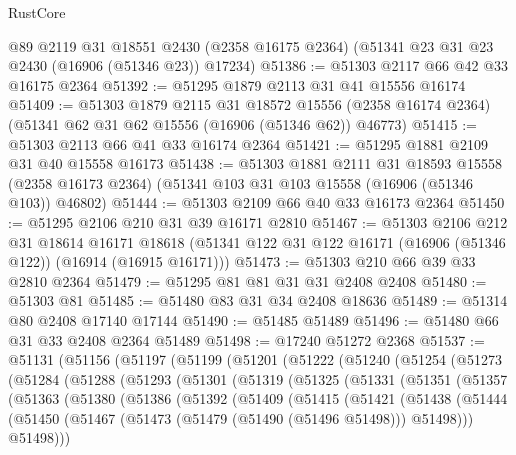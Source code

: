 \begin{lexlean}{RustCore}
\begin{coremodule}
    @89
    @2119
    @31
    @18551
    @2430
    (@2358 @16175 @2364)
    (@51341 @23 @31 @23 @2430 (@16906 (@51346 @23)) @17234)
@51386 := @51303 @2117 @66 @42 @33 @16175 @2364
@51392 := @51295 @1879 @2113 @31 @41 @15556 @16174
@51409 := @51303
    @1879
    @2115
    @31
    @18572
    @15556
    (@2358 @16174 @2364)
    (@51341 @62 @31 @62 @15556 (@16906 (@51346 @62)) @46773)
@51415 := @51303 @2113 @66 @41 @33 @16174 @2364
@51421 := @51295 @1881 @2109 @31 @40 @15558 @16173
@51438 := @51303
    @1881
    @2111
    @31
    @18593
    @15558
    (@2358 @16173 @2364)
    (@51341 @103 @31 @103 @15558 (@16906 (@51346 @103)) @46802)
@51444 := @51303 @2109 @66 @40 @33 @16173 @2364
@51450 := @51295 @2106 @210 @31 @39 @16171 @2810
@51467 := @51303
    @2106
    @212
    @31
    @18614
    @16171
    @18618
    (@51341 @122 @31 @122 @16171 (@16906 (@51346 @122)) (@16914 (@16915 @16171)))
@51473 := @51303 @210 @66 @39 @33 @2810 @2364
@51479 := @51295 @81 @81 @31 @31 @2408 @2408
@51480 := @51303 @81
@51485 := @51480 @83 @31 @34 @2408 @18636
@51489 := @51314 @80 @2408 @17140 @17144
@51490 := @51485 @51489
@51496 := @51480 @66 @31 @33 @2408 @2364 @51489
@51498 := @17240 @51272 @2368
@51537 := @51131
    (@51156
      (@51197
        (@51199
          (@51201
            (@51222
              (@51240
                (@51254
                  (@51273
                    (@51284
                      (@51288
                        (@51293
                          (@51301
                            (@51319
                              (@51325
                                (@51331
                                  (@51351
                                    (@51357
                                      (@51363
                                        (@51380
                                          (@51386
                                            (@51392
                                              (@51409
                                                (@51415
                                                  (@51421
                                                    (@51438
                                                      (@51444
                                                        (@51450
                                                          (@51467
                                                            (@51473
                                                              (@51479 (@51490 (@51496 @51498)))
                                                              @51498)))
                                                        @51498)))

\end{coremodule}
\end{lexlean}
